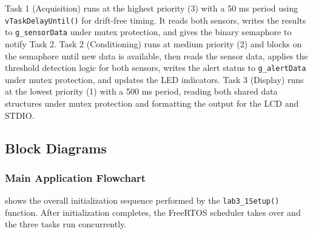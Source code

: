 Task 1 (Acquisition) runs at the highest priority (3) with a 50 ms period using \texttt{vTaskDelayUntil()} for drift-free timing. It reads both sensors, writes the results to \texttt{g\_sensorData} under mutex protection, and gives the binary semaphore to notify Task 2. Task 2 (Conditioning) runs at medium priority (2) and blocks on the semaphore until new data is available, then reads the sensor data, applies the threshold detection logic for both sensors, writes the alert status to \texttt{g\_alertData} under mutex protection, and updates the LED indicators. Task 3 (Display) runs at the lowest priority (1) with a 500 ms period, reading both shared data structures under mutex protection and formatting the output for the LCD and STDIO.

\subsection{Block Diagrams}

\subsubsection{Main Application Flowchart}

 shows the overall initialization sequence performed by the \texttt{lab3\_1Setup()} function. After initialization completes, the FreeRTOS scheduler takes over and the three tasks run concurrently.


